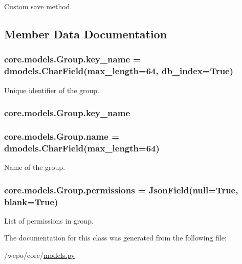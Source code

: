 Custom save method. 



\subsection{Member Data Documentation}
\hypertarget{classcore_1_1models_1_1Group_a0e455bf93e8ef057105e84940632e65e}{
\subsubsection[{key\-\_\-name}]{\setlength{\rightskip}{0pt plus 5cm}core.\-models.\-Group.\-key\-\_\-name = dmodels.\-Char\-Field(max\-\_\-length=64, db\-\_\-index=True)\hspace{0.3cm}{\ttfamily [static]}}}\label{classcore_1_1models_1_1Group_a0e455bf93e8ef057105e84940632e65e}


Unique identifier of the group. 

\hypertarget{classcore_1_1models_1_1Group_a0e455bf93e8ef057105e84940632e65e}{
\subsubsection[{key\-\_\-name}]{\setlength{\rightskip}{0pt plus 5cm}core.\-models.\-Group.\-key\-\_\-name}}\label{classcore_1_1models_1_1Group_a0e455bf93e8ef057105e84940632e65e}
\hypertarget{classcore_1_1models_1_1Group_a4cdd32a2664af27834735b341b78422a}{
\subsubsection[{name}]{\setlength{\rightskip}{0pt plus 5cm}core.\-models.\-Group.\-name = dmodels.\-Char\-Field(max\-\_\-length=64)\hspace{0.3cm}{\ttfamily [static]}}}\label{classcore_1_1models_1_1Group_a4cdd32a2664af27834735b341b78422a}


Name of the group. 

\hypertarget{classcore_1_1models_1_1Group_af6dd4a8383b686c8eb65fdb5310983a6}{
\subsubsection[{permissions}]{\setlength{\rightskip}{0pt plus 5cm}core.\-models.\-Group.\-permissions = {\bf Json\-Field}(null=True, blank=True)\hspace{0.3cm}{\ttfamily [static]}}}\label{classcore_1_1models_1_1Group_af6dd4a8383b686c8eb65fdb5310983a6}


List of permissions in group. 



The documentation for this class was generated from the following file\-:\begin{DoxyCompactItemize}
\item 
/wepo/core/\hyperlink{models_8py}{models.\-py}\end{DoxyCompactItemize}
